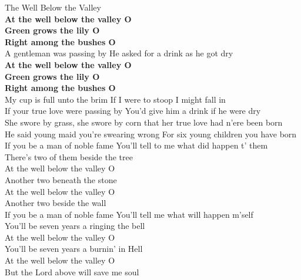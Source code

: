\documentclass[letterpaper,9pt]{article}
\begin{document}
\Huge
The Well Below the Valley\\

\Large
\textbf{At the well below the valley O \\
Green grows the lily O \\
Right among the bushes O} \\

A gentleman was passing by He asked for a drink as he got dry \\
\textbf{At the well below the valley O \\
Green grows the lily O \\
Right among the bushes O} \\

My cup is full unto the brim If I were to stoop I might fall in \\

If your true love were passing by You'd give him a drink if he were dry \\

She swore by grass, she swore by corn that her true love had n'ere been born \\

He said young maid you're swearing wrong For six young children you have born \\

If you be a man of noble fame You'll tell to me what did happen t' them \\

There's two of them beside the tree \\
At the well below the valley O \\
Another two beneath the stone \\
At the well below the valley O \\
Another two beside the wall \\

If you be a man of noble fame You'll tell me what will happen m'self \\

You'll be seven years a ringing the bell \\
At the well below the valley O \\
You'll be seven years a burnin' in Hell \\
At the well below the valley O \\
But the Lord above will save me soul \\
\end{document}

